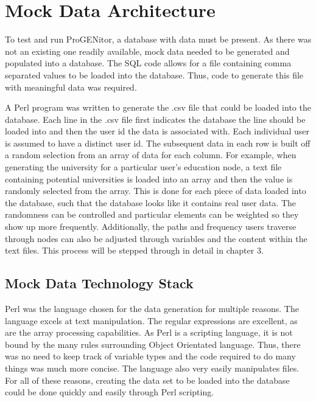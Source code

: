 \section{Mock Data Architecture}
	To test and run ProGENitor, a database with data must be present.  As there was
not an existing one readily available, mock data needed to be generated and
populated into a database.  The SQL code allows for a file containing comma
separated values to be loaded into the database.  Thus, code to generate this
file with meaningful data was required.  
	
A Perl program was written to generate the .csv file that could be loaded into
the database.  Each line in the .csv file first indicates the database the line
should be loaded into and then the user id the data is associated with.  Each
individual user is assumed to have a distinct user id.  The subsequent data in
each row is built off a random selection from an array of data for each column.
For example, when generating the university for a particular user's education
node, a text file containing potential universities is loaded into an array and
then the value is randomly selected from the array.  This is done for each piece
of data loaded into the database, such that the database looks like it contains
real user data.  The randomness can be controlled and particular elements can be
weighted so they show up more frequently.  Additionally, the paths and
frequency users traverse through nodes can also be adjusted through variables
and the content within the text files.  This process will be stepped through in
detail in chapter 3.

\subsection{Mock Data Technology Stack}
Perl was the language chosen for the data generation for multiple reasons.  The
language excels at text manipulation.  The regular expressions are excellent, as
are the array processing capabilities.  As Perl is a scripting language, it is
not bound by the many rules surrounding Object Orientated language.  Thus,
there was no need to keep track of variable types and the code required to do
many things was much more concise.  The language also very easily manipulates
files.  For all of these reasons, creating the data set to be loaded into the
database could be done quickly and easily through Perl scripting.
